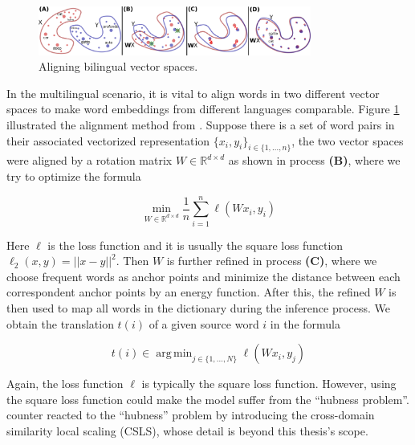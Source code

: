 \documentclass[thesis,fonts=libertine]{cluu}
\DeclareMathOperator*{\argmin}{arg\,min}
\begin{document}
\begin{figure}
  \label{fig:vec_space_align}
  \centering
  \includegraphics[width=0.8\textwidth]{vector_spaces_alignment.png}
  \caption{Aligning bilingual vector spaces. \parencite{Conneau:2017aa}}
\end{figure}

In the multilingual scenario, it is vital to align words in two different vector spaces to make word embeddings from different languages comparable. Figure \ref{fig:vec_space_align} illustrated the alignment method from \cite{Conneau:2017aa}. Suppose there is a set of word pairs in their associated vectorized representation $\{x_i, y_i\}_{i\in \{1, ..., n\}}$, the two vector spaces were aligned by a rotation matrix $W \in \mathbb{R}^{d \times d}$ as shown in process \textbf{(B)}, where we try to optimize the formula 

\begin{equation*}
  \min_{W \in \mathbb{R}^{d \times d}} \frac{1}{n}\sum_{i=1}^n \ell(Wx_i, y_i)
\end{equation*}

Here $\ell$ is the loss function and it is usually the square loss function $\ell_2(x, y)=||x-y||^2$. Then $W$ is further refined in process \textbf{(C)}, where we choose frequent words as anchor points and minimize the distance between each correspondent anchor points by an energy function. After this, the refined $W$ is then used to map all words in the dictionary during the inference process. We obtain the translation $t(i)$ of a given source word $i$ in the formula

\begin{equation*}
  t(i) \in \argmin_{j\in \{1, ..., N\}} \ell(Wx_i, y_j)
\end{equation*}

Again, the loss function $\ell$ is typically the square loss function. However, using the square loss function could make the model suffer from the ``hubness problem''. \cite{Conneau:2017aa} counter reacted to the ``hubness'' problem by introducing the cross-domain similarity local scaling (CSLS), whose detail is beyond this thesis's scope.
\end{document}
